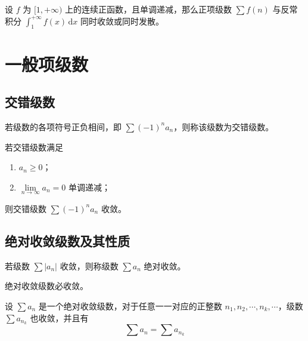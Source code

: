 \begin{theorem}[积分判别法]
    设 $f$ 为 $[1,+\infty)$ 上的连续正函数，且单调递减，那么正项级数 $\sum f(n)$ 与反常积分 $\int_{1}^{+\infty} f(x) \, \mathrm{d}x$ 同时收敛或同时发散。
\end{theorem}

\section{一般项级数}

\subsection{交错级数}

\begin{definition}
    若级数的各项符号正负相间，即 $\sum (-1)^{n} a_{n}$，则称该级数为交错级数。
\end{definition}

\begin{theorem}[莱布尼茨判别法]
    若交错级数满足
    \begin{enumerate}
        \item $a_{n} \geq 0$；
        \item $\lim\limits_{n \to \infty} a_{n} = 0$ 单调递减；
    \end{enumerate}
    则交错级数 $\sum (-1)^{n} a_{n}$ 收敛。
\end{theorem}

\subsection{绝对收敛级数及其性质}

\begin{definition}
    若级数 $\sum |a_{n}|$ 收敛，则称级数 $\sum a_{n}$ 绝对收敛。
\end{definition}

\begin{theorem}
    绝对收敛级数必收敛。
\end{theorem}

\begin{theorem}[级数的重排]
    设 $\sum a_{n}$ 是一个绝对收敛级数，对于任意一一对应的正整数 $n_{1},n_{2},\cdots,n_{k},\cdots$，级数 $\sum a_{n_{k}}$ 也收敛，并且有
    \begin{equation*}
        \sum a_{n} = \sum a_{n_{k}}
    \end{equation*}
\end{theorem}

